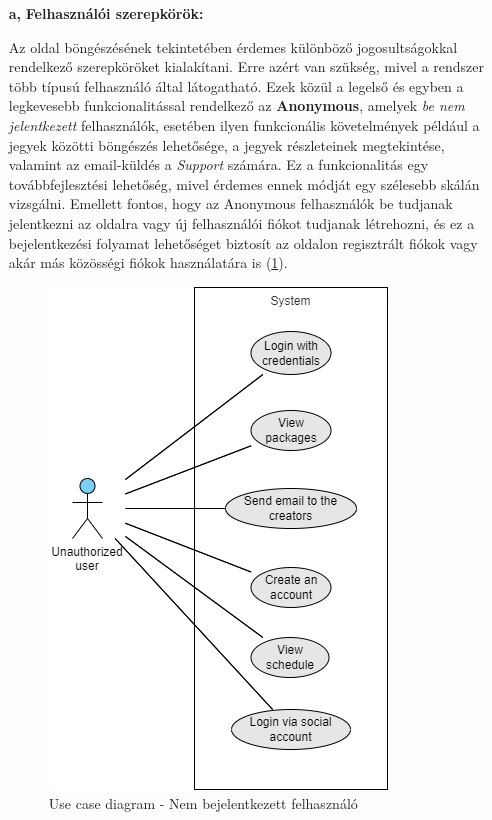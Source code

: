 \begin{itemize}
  	\item[\textbf{a,}] \textbf{Felhasználói szerepkörök:}

Az oldal böngészésének tekintetében érdemes különböző jogosultságokkal rendelkező szerepköröket kialakítani. Erre azért van szükség, mivel a rendszer több típusú felhasználó által látogatható. Ezek közül a legelső és egyben a legkevesebb funkcionalitással rendelkező az \textbf{Anonymous}, amelyek \textit{be nem jelentkezett} felhasználók, esetében ilyen funkcionális követelmények például a jegyek közötti böngészés lehetősége, a jegyek részleteinek megtekintése, valamint az email-küldés a \textit{Support} számára. Ez a funkcionalitás egy továbbfejlesztési lehetőség, mivel érdemes ennek módját egy szélesebb skálán vizsgálni. Emellett fontos, hogy az Anonymous felhasználók be tudjanak jelentkezni az oldalra vagy új felhasználói fiókot tudjanak létrehozni, és ez a bejelentkezési folyamat lehetőséget biztosít az oldalon regisztrált fiókok vagy akár más közösségi fiókok használatára is (\ref{abra:useCaseNA}).

\begin{figure}[!h]
	\centering
	\includegraphics[scale=0.7]{images/useCaseNA}
	\caption{Use case diagram - Nem bejelentkezett felhasználó}
	\label{abra:useCaseNA}
\end{figure}
\pagebreak


\end{itemize}
